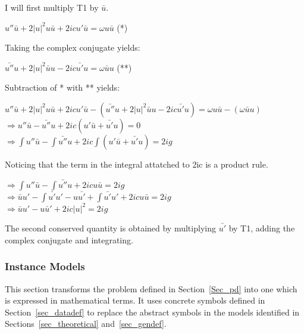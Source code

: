 \documentclass[12pt]{article}
\begin{document}
I will first multiply T1 by $\bar{u}$. \\ 
\begin{center}
$  u''\bar{u} + 2|u|^{2}u \bar{u}+2icu' \bar{u}=\omega u \bar{u}$ (*) \\ 
\end{center}
Taking the complex conjugate yields: \\ 
\begin{center}
$ \bar{u''} u + 2|u|^{2} \bar{u} u -2ic\bar{u'}u = \omega \bar{u} u$ (**) \\ 
\end{center} 
Subtraction of * with ** yields: \\ 
\begin{center} 
$  u''\bar{u} + 2|u|^{2}u \bar{u}+2icu' \bar{u} - (\bar{u''} u + 2|u|^{2} 
\bar{u} u -2ic\bar{u'}u) =\omega u \bar{u} - (\omega \bar{u} u)$\\ 
$ \Rightarrow  u''\bar{u} - \bar{u''} u + 2ic (u' \bar{u} + \bar{u'}u ) = 0$ \\
$ \Rightarrow \int u''\bar{u} - \int \bar{u''} u + 2ic \int (u' \bar{u} + 
\bar{u'}u ) = 2ig  $ \\  
\end{center} 
Noticing that the term in the integral attatched to 2ic is a product rule.\\ 
\begin{center}
$ \Rightarrow \int u''\bar{u} - \int \bar{u''} u + 2icu \bar{u} = 2ig $ \\
$ \Rightarrow \bar{u}u' - \int \bar{u'} u' - u \bar{u'} + \int \bar{u'} u' + 
2icu \bar{u} = 2ig$ \\ 
$ \Rightarrow \bar{u}u' - u\bar{u}' + 2ic|u|^{2} = 2ig$ \\ 
\end{center} 
The second conserved quantity is obtained by multiplying $\bar{u'}$ by T1, 
adding the complex conjugate and integrating. 

\subsubsection{Instance Models} \label{sec_instance}    

This section transforms the problem defined in Section~\ref{Sec_pd} into 
one which is expressed in mathematical terms. It uses concrete symbols defined 
in Section~\ref{sec_datadef} to replace the abstract symbols in the models 
identified in Sections~\ref{sec_theoretical} and~\ref{sec_gendef}. \\
\end{document}
